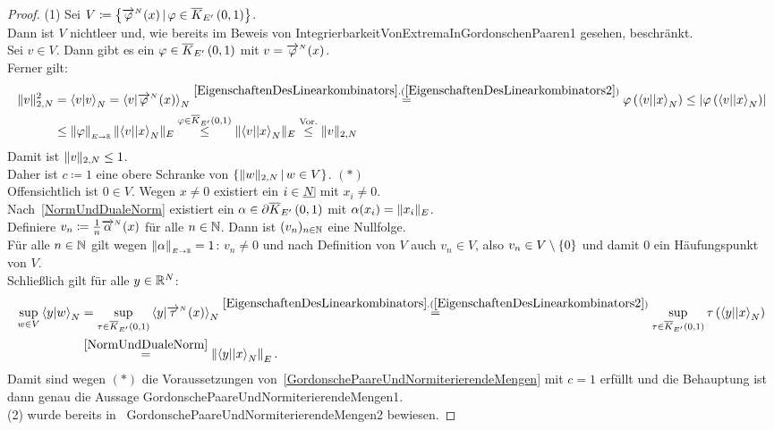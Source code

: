 \begin{proof}
(1) Sei $V\coloneqq  \left\{{\overrightarrow{\varphi}}^{{}_N} (x)\,|\,\varphi \in \overline K_{E'}\left(0, 1\right)\right\}$.\\
Dann ist $V$ nichtleer und, wie bereits im Beweis von
{IntegrierbarkeitVonExtremaInGordonschenPaaren1} gesehen, beschränkt.\\
Sei $v \in V$. Dann gibt es ein $\varphi \in \overline K_{E'}\left(0, 1\right)$ mit $v={\overrightarrow{\varphi}}^{{}_N}(x)$.\\
Ferner gilt:
\begin{align*}
\norm v_{2, N}^2 &= \sprod v v_N = \sprod v {\pfeil \varphi N(x)}_N
\overset{\refclaim{EigenschaftenDesLinearkombinators}
{EigenschaftenDesLinearkombinators2}}=
\varphi\left(\bprod v x_N \right) \le \abs{\varphi\left(\bprod v x_N \right)}\\
&\le \opnorm \varphi E \R\norm{\bprod v x_N}_E\overset{\varphi \in \kabg{E'}01}\le
\norm{\bprod v x_N}_E \overset{\text{Vor.}}\le \norm v _{2, N}
\end{align*}
Damit ist $\lVert v\rVert _{2, N} \le 1$.\\
Daher ist $c\coloneqq 1$ eine obere Schranke von $\left\{\lVert w\rVert _{2, N}\,|\,w \in V\right\}$.
\hfill $(\ast)$\\
Offensichtlich ist $0 \in V$. Wegen $x \neq 0$ existiert ein $i \in \haken N$
mit $x_i \neq 0$.\\ Nach~\ref{NormUndDualeNorm} existiert ein 
$\alpha \in \partial \overline K_{E'}\left(0, 1\right)$ mit $\alpha(x_i) = \lVert x_i\rVert_E$.\\
Definiere $v_n \coloneqq  \frac 1 n {\overrightarrow{\alpha}}^{{}_N} (x)$ für alle $n \in \mathbb{N}$.
Dann ist $(v_n)_{n \in \mathbb{N}}$ eine Nullfolge.\\
Für alle $n \in \mathbb{N}$ gilt wegen $\left\|\alpha\right\|_{\scriptscriptstyle{E \rightarrow \ensuremath{\mathbb{R}}}}= 1$: $v_n \neq 0$ und
nach Definition von $V$ auch $v_n \in V$, also $v_n \in V\setminus \left\{0\right\}$
und damit $0$ ein Häufungspunkt von $V$.\\
Schließlich gilt für alle $y\in\mathbb{R}^N$:
\begin{align*}
\sup_{w\in V} \sprod y w _N 
&= \sup_{\tau \in \kabg{E'}01}\sprod y {\pfeil \tau N (x)}_N
\overset{\refclaim{EigenschaftenDesLinearkombinators}
{EigenschaftenDesLinearkombinators2}}= \sup_{\tau \in \kabg{E'}01} 
\tau\left(\bprod y x_N \right)\\& \overset{\ref{NormUndDualeNorm}}=
\norma{\bprod y x_N}_E\text.
\end{align*}
Damit sind wegen $(\ast)$ die Voraussetzungen von~\ref{GordonschePaareUndNormiterierendeMengen} mit $c=1$ erfüllt und die Behauptung ist dann genau die Aussage
{GordonschePaareUndNormiterierendeMengen1}.\\
(2) wurde bereits in~
{GordonschePaareUndNormiterierendeMengen2} bewiesen.
\end{proof}